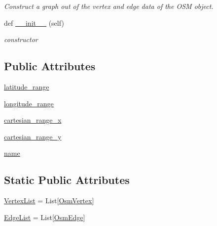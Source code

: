 \begin{DoxyCompactItemize}
\begin{DoxyCompactList}\small\item\em Construct a graph out of the vertex and edge data of the O\+SM object. \end{DoxyCompactList}\item 
def \hyperlink{classbridges_1_1data__src__dependent_1_1osm_1_1_osm_data_ab36ec2f4933157aed6c28a02b258afee}{\+\_\+\+\_\+init\+\_\+\+\_\+} (self)
\begin{DoxyCompactList}\small\item\em constructor \end{DoxyCompactList}\end{DoxyCompactItemize}
\subsection*{Public Attributes}
\begin{DoxyCompactItemize}
\item 
\hyperlink{classbridges_1_1data__src__dependent_1_1osm_1_1_osm_data_a88caf10c4151c04822cb66af364fd45d}{latitude\+\_\+range}
\item 
\hyperlink{classbridges_1_1data__src__dependent_1_1osm_1_1_osm_data_a7745c671626fb8e97532ff8a9097a780}{longitude\+\_\+range}
\item 
\hyperlink{classbridges_1_1data__src__dependent_1_1osm_1_1_osm_data_a81e77104409461472dcaa68e68eb23da}{cartesian\+\_\+range\+\_\+x}
\item 
\hyperlink{classbridges_1_1data__src__dependent_1_1osm_1_1_osm_data_a5eb0046aadd6da88ca4cac617b054eb3}{cartesian\+\_\+range\+\_\+y}
\item 
\hyperlink{classbridges_1_1data__src__dependent_1_1osm_1_1_osm_data_adb5034420cd207bec97d80fab5e5be3a}{name}
\end{DoxyCompactItemize}
\subsection*{Static Public Attributes}
\begin{DoxyCompactItemize}
\item 
\hyperlink{classbridges_1_1data__src__dependent_1_1osm_1_1_osm_data_aa2bc633ab0d64a560165a1d55cc1f3a4}{Vertex\+List} = List\mbox{[}\hyperlink{classbridges_1_1data__src__dependent_1_1osm_1_1_osm_vertex}{Osm\+Vertex}\mbox{]}
\item 
\hyperlink{classbridges_1_1data__src__dependent_1_1osm_1_1_osm_data_a18b0ef38dba7bedcddd29d38d71d91d2}{Edge\+List} = List\mbox{[}\hyperlink{classbridges_1_1data__src__dependent_1_1osm_1_1_osm_edge}{Osm\+Edge}\mbox{]}
\end{DoxyCompactItemize}


